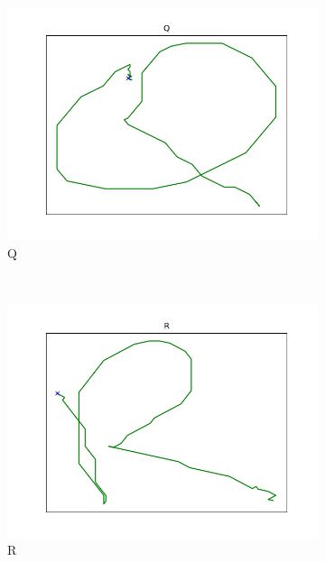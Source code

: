 \begin{figure}
\begin{subfigure}[b]{0.14\textwidth}
        \includegraphics[width=\textwidth]{images/gbem/orig_letters_fig/AORIG_letter_Q_writer_4.png}
        \caption{Q}
    \end{subfigure}
    ~
    \begin{subfigure}[b]{0.14\textwidth}
        \includegraphics[width=\textwidth]{images/gbem/orig_letters_fig/AORIG_letter_R_writer_2.png}
        \caption{R}
    \end{subfigure}
    ~
    \begin{subfigure}[b]{0.14\textwidth}

\end{subfigure}
\end{figure}
